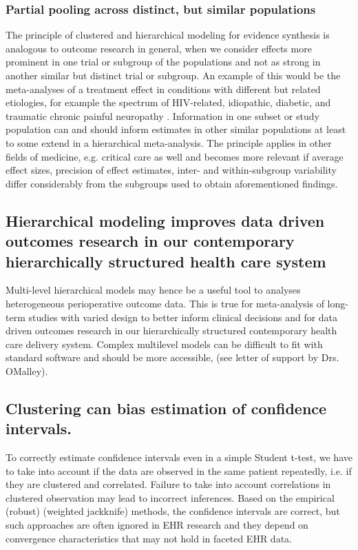\documentclass[11pt,notitlepage]{article}
\begin{document}
\subsubsection*{Partial pooling across distinct, but similar populations}
The principle  of clustered and hierarchical modeling for evidence synthesis is analogous to outcome research in general, when we consider effects more prominent in one trial or subgroup of the populations and not as strong in another similar but distinct trial or subgroup. An example of this would be the meta-analyses of a treatment effect in conditions with different but related etiologies, for example the spectrum of HIV-related, idiopathic, diabetic, and traumatic chronic painful neuropathy \cite{Andreae2015}. Information in one subset or study population can and should inform estimates in other similar populations at least to some extend in a hierarchical meta-analysis. The principle applies in other fields of medicine, e.g. critical care as well \cite{Roth2015CriticalCare} and becomes more relevant if average effect sizes, precision of effect estimates, inter- and within-subgroup variability differ considerably from the subgroups used to obtain aforementioned findings.

\subsection*{Hierarchical modeling improves data driven outcomes research in our contemporary hierarchically structured health care system}
 
Multi-level hierarchical models may hence be a useful tool to analyses heterogeneous perioperative outcome data. This is true for meta-analysis of long-term studies with varied design to better inform clinical decisions\cite{AndreaeJohnsonAbstract2013,Spiegelhalter2004bayesian} and for data driven outcomes research  in our hierarchically structured contemporary health care delivery system. Complex multilevel models can be difficult to fit with standard software and should be more accessible, (see letter of support by Drs. OMalley).

\subsection*{Clustering can bias estimation of confidence intervals.} To correctly estimate confidence intervals even in a simple Student t-test, we have to take into account if the data are observed in the same patient repeatedly, i.e. if they are clustered and correlated. Failure to take into account correlations in clustered observation may lead to incorrect inferences. Based on the empirical (robust) (weighted jackknife) methods, the confidence intervals are correct, but such approaches are often ignored in EHR research and they depend on convergence characteristics that may not hold in faceted EHR data. 
\end{document}
